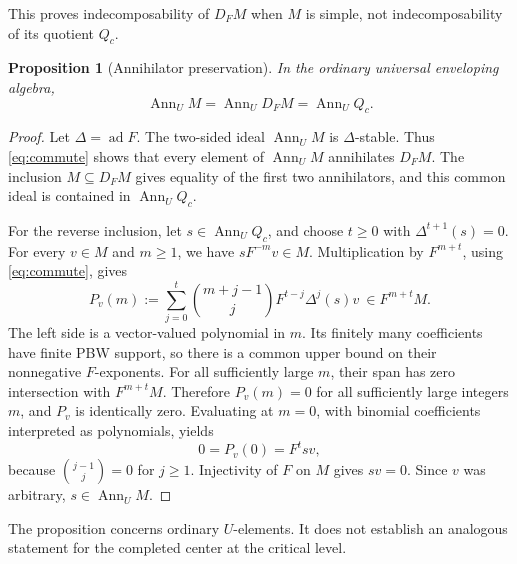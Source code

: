 \documentclass[11pt,a4paper]{article}
\newcommand{\ad}{\operatorname{ad}}
\newcommand{\Ann}{\operatorname{Ann}}
\theoremstyle{plainupright}
\newtheorem{proposition}{Proposition}[section]
\begin{document}
This proves indecomposability of \(D_FM\) when \(M\) is simple,
not indecomposability of its quotient \(Q_c\).

\begin{proposition}[Annihilator preservation]\label{prop:ann}
In the ordinary universal enveloping algebra,
\[
\Ann_U M=\Ann_U D_FM=\Ann_U Q_c.
\]
\end{proposition}
\begin{proof}
Let \(\Delta=\ad F\). The two-sided ideal \(\Ann_U M\) is
\(\Delta\)-stable. Thus \eqref{eq:commute} shows that every element of
\(\Ann_U M\) annihilates \(D_FM\). The inclusion \(M\subseteq D_FM\)
gives equality of the first two annihilators, and this common ideal
is contained in \(\Ann_U Q_c\).

For the reverse inclusion, let \(s\in\Ann_U Q_c\), and choose \(t\ge0\)
with \(\Delta^{t+1}(s)=0\). For every \(v\in M\) and \(m\ge1\),
we have \(sF^{-m}v\in M\). Multiplication by \(F^{m+t}\), using
\eqref{eq:commute}, gives
\begin{equation}\label{eq:ann-poly}
P_v(m):=\sum_{j=0}^t\binom{m+j-1}{j}
F^{t-j}\Delta^j(s)v\ \in F^{m+t}M.
\end{equation}
The left side is a vector-valued polynomial in \(m\).
Its finitely many coefficients have finite PBW support, so there is
a common upper bound on their nonnegative \(F\)-exponents.
For all sufficiently large \(m\), their span has zero intersection
with \(F^{m+t}M\). Therefore \(P_v(m)=0\) for all sufficiently large
integers \(m\), and \(P_v\) is identically zero.
Evaluating at \(m=0\), with binomial coefficients interpreted as
polynomials, yields
\[
0=P_v(0)=F^tsv,
\]
because \(\binom{j-1}{j}=0\) for \(j\ge1\).
Injectivity of \(F\) on \(M\) gives \(sv=0\). Since \(v\) was arbitrary,
\(s\in\Ann_U M\).
\end{proof}

The proposition concerns ordinary \(U\)-elements. It does not establish
an analogous statement for the completed center at the critical level.
\end{document}
